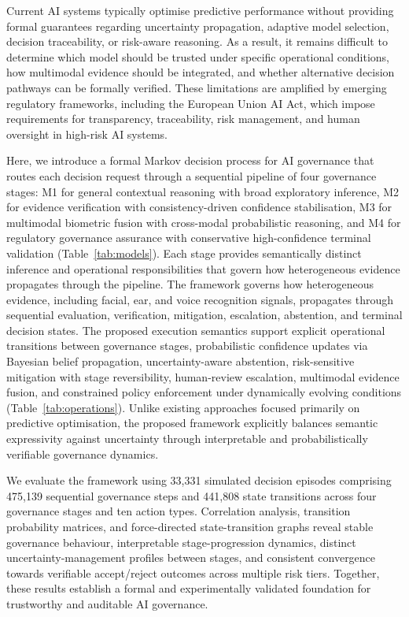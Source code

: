 \documentclass{article}
\begin{document}
Current AI systems typically optimise predictive performance without providing formal guarantees regarding uncertainty propagation, adaptive model selection, decision traceability, or risk-aware reasoning. As a result, it remains difficult to determine which model should be trusted under specific operational conditions, how multimodal evidence should be integrated, and whether alternative decision pathways can be formally verified. These limitations are amplified by emerging regulatory frameworks, including the European Union AI Act, which impose requirements for transparency, traceability, risk management, and human oversight in high-risk AI systems.

Here, we introduce a formal Markov decision process for AI governance that routes each decision request through a sequential pipeline of four governance stages: M1 for general contextual reasoning with broad exploratory inference, M2 for evidence verification with consistency-driven confidence stabilisation, M3 for multimodal biometric fusion with cross-modal probabilistic reasoning, and M4 for regulatory governance assurance with conservative high-confidence terminal validation (Table~\ref{tab:models}). Each stage provides semantically distinct inference and operational responsibilities that govern how heterogeneous evidence propagates through the pipeline. The framework governs how heterogeneous evidence, including facial, ear, and voice recognition signals, propagates through sequential evaluation, verification, mitigation, escalation, abstention, and terminal decision states. The proposed execution semantics support explicit operational transitions between governance stages, probabilistic confidence updates via Bayesian belief propagation, uncertainty-aware abstention, risk-sensitive mitigation with stage reversibility, human-review escalation, multimodal evidence fusion, and constrained policy enforcement under dynamically evolving conditions (Table~\ref{tab:operations}). Unlike existing approaches focused primarily on predictive optimisation, the proposed framework explicitly balances semantic expressivity against uncertainty through interpretable and probabilistically verifiable governance dynamics.

We evaluate the framework using 33,331 simulated decision episodes comprising 475,139 sequential governance steps and 441,808 state transitions across four governance stages and ten action types. Correlation analysis, transition probability matrices, and force-directed state-transition graphs reveal stable governance behaviour, interpretable stage-progression dynamics, distinct uncertainty-management profiles between stages, and consistent convergence towards verifiable accept/reject outcomes across multiple risk tiers. Together, these results establish a formal and experimentally validated foundation for trustworthy and auditable AI governance.
\end{document}

